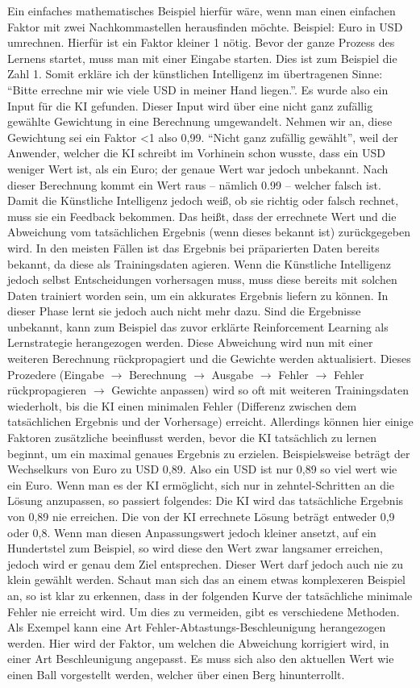 Ein einfaches mathematisches Beispiel hierfür wäre, wenn man einen einfachen Faktor mit zwei Nachkommastellen herausfinden möchte. Beispiel: Euro in USD umrechnen. Hierfür ist ein Faktor kleiner 1 nötig. Bevor der ganze Prozess des Lernens startet, muss man mit einer Eingabe starten. Dies ist zum Beispiel die Zahl 1. Somit erkläre ich der künstlichen Intelligenz im übertragenen Sinne: ``Bitte errechne mir wie viele USD in meiner Hand liegen.''. Es wurde also ein Input für die KI gefunden. Dieser Input wird über eine nicht ganz zufällig gewählte Gewichtung in eine Berechnung umgewandelt. Nehmen wir an, diese Gewichtung sei ein Faktor <1 also 0,99. ``Nicht ganz zufällig gewählt'', weil der Anwender, welcher die KI schreibt im Vorhinein schon wusste, dass ein USD weniger Wert ist, als ein Euro; der genaue Wert war jedoch unbekannt. Nach dieser Berechnung kommt ein Wert raus – nämlich 0.99 – welcher falsch ist. Damit die Künstliche Intelligenz jedoch weiß, ob sie richtig oder falsch rechnet, muss sie ein Feedback bekommen. Das heißt, dass der errechnete Wert und die Abweichung vom tatsächlichen Ergebnis (wenn dieses bekannt ist) zurückgegeben wird. In den meisten Fällen ist das Ergebnis bei präparierten Daten bereits bekannt, da diese als Trainingsdaten agieren. Wenn die Künstliche Intelligenz jedoch selbst Entscheidungen vorhersagen muss, muss diese bereits mit solchen Daten trainiert worden sein, um ein akkurates Ergebnis liefern zu können. In dieser Phase lernt sie jedoch auch nicht mehr dazu. Sind die Ergebnisse unbekannt, kann zum Beispiel das zuvor erklärte Reinforcement Learning als Lernstrategie herangezogen werden. Diese Abweichung wird nun mit einer weiteren Berechnung rückpropagiert und die Gewichte werden aktualisiert. Dieses Prozedere (Eingabe $\rightarrow$ Berechnung $\rightarrow$ Ausgabe $\rightarrow$ Fehler $\rightarrow$ Fehler rückpropagieren $\rightarrow$ Gewichte anpassen) wird so oft mit weiteren Trainingsdaten wiederholt, bis die KI einen minimalen Fehler (Differenz zwischen dem tatsächlichen Ergebnis und der Vorhersage) erreicht.
Allerdings können hier einige Faktoren zusätzliche beeinflusst werden, bevor die KI tatsächlich zu lernen beginnt, um ein maximal genaues Ergebnis zu erzielen. Beispielsweise beträgt der Wechselkurs von Euro zu USD 0,89. Also ein USD ist nur 0,89 so viel wert wie ein Euro. Wenn man es der KI ermöglicht, sich nur in zehntel-Schritten an die Lösung anzupassen, so passiert folgendes:
Die KI wird das tatsächliche Ergebnis von 0,89 nie erreichen. Die von der KI errechnete Lösung beträgt entweder 0,9 oder 0,8. Wenn man diesen Anpassungswert jedoch kleiner ansetzt, auf ein Hundertstel zum Beispiel, so wird diese den Wert zwar langsamer erreichen, jedoch wird er genau dem Ziel entsprechen.
Dieser Wert darf jedoch auch nie zu klein gewählt werden. Schaut man sich das an einem etwas komplexeren Beispiel an, so ist klar zu erkennen, dass in der folgenden Kurve der tatsächliche minimale Fehler nie erreicht wird. Um dies zu vermeiden, gibt es verschiedene Methoden. Als Exempel kann eine Art Fehler-Abtastungs-Beschleunigung herangezogen werden. Hier wird der Faktor, um welchen die Abweichung korrigiert wird, in einer Art Beschleunigung angepasst. Es muss sich also den aktuellen Wert wie einen Ball vorgestellt werden, welcher über einen Berg hinunterrollt.

